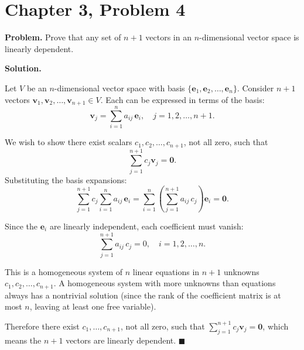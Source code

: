 \documentclass[12pt]{article}
\begin{document}
\section*{Chapter 3, Problem 4}

\textbf{Problem.} Prove that any set of $n + 1$ vectors in an $n$-dimensional vector space is linearly dependent.

\bigskip
\textbf{Solution.}

Let $V$ be an $n$-dimensional vector space with basis $\{\mathbf{e}_1, \mathbf{e}_2, \ldots, \mathbf{e}_n\}$. Consider $n+1$ vectors $\mathbf{v}_1, \mathbf{v}_2, \ldots, \mathbf{v}_{n+1} \in V$. Each can be expressed in terms of the basis:
\[
\mathbf{v}_j = \sum_{i=1}^{n} a_{ij}\, \mathbf{e}_i, \quad j = 1, 2, \ldots, n+1.
\]

We wish to show there exist scalars $c_1, c_2, \ldots, c_{n+1}$, not all zero, such that
\[
\sum_{j=1}^{n+1} c_j \mathbf{v}_j = \mathbf{0}.
\]
Substituting the basis expansions:
\[
\sum_{j=1}^{n+1} c_j \sum_{i=1}^{n} a_{ij}\, \mathbf{e}_i = \sum_{i=1}^{n}\left(\sum_{j=1}^{n+1} a_{ij}\, c_j\right) \mathbf{e}_i = \mathbf{0}.
\]

Since the $\mathbf{e}_i$ are linearly independent, each coefficient must vanish:
\[
\sum_{j=1}^{n+1} a_{ij}\, c_j = 0, \quad i = 1, 2, \ldots, n.
\]

This is a homogeneous system of $n$ linear equations in $n+1$ unknowns $c_1, c_2, \ldots, c_{n+1}$. A homogeneous system with more unknowns than equations always has a nontrivial solution (since the rank of the coefficient matrix is at most $n$, leaving at least one free variable).

Therefore there exist $c_1, \ldots, c_{n+1}$, not all zero, such that $\sum_{j=1}^{n+1} c_j \mathbf{v}_j = \mathbf{0}$, which means the $n+1$ vectors are linearly dependent. \hfill $\blacksquare$
\end{document}
